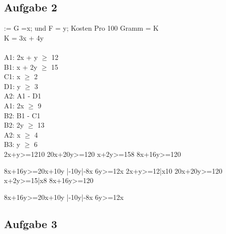 \documentclass{article}
\begin{document}
	\subsection*{Aufgabe 2}
	:= G =x; und F = y; Kosten Pro 100 Gramm = K \\
	K = 3x + 4y \\ \\
	A1: 2x + y $\geq$ 12 \\
	B1: x + 2y $\geq$ 15 \\
	C1: x $\geq$ 2 \\
	D1: y $\geq$ 3 \\
	A2: A1 - D1 \\
	A1: 2x $\geq$ 9 \\
	B2: B1 - C1 \\
	B2: 2y $\geq$ 13 \\
	A2: x $\geq$ 4 \\
	B3: y $\geq$ 6 \\
	
	2x+y>=1210
	20x+20y>=120
	x+2y>=158
	8x+16y>=120
	
	8x+16y>=20x+10y    |-10y|-8x
	6y>=12x
	2x+y>=12|x10
	20x+20y>=120
	x+2y>=15|x8
	8x+16y>=120
	
	8x+16y>=20x+10y    |-10y|-8x
	6y>=12x
	\subsection*{Aufgabe 3}
	
\end{document}
